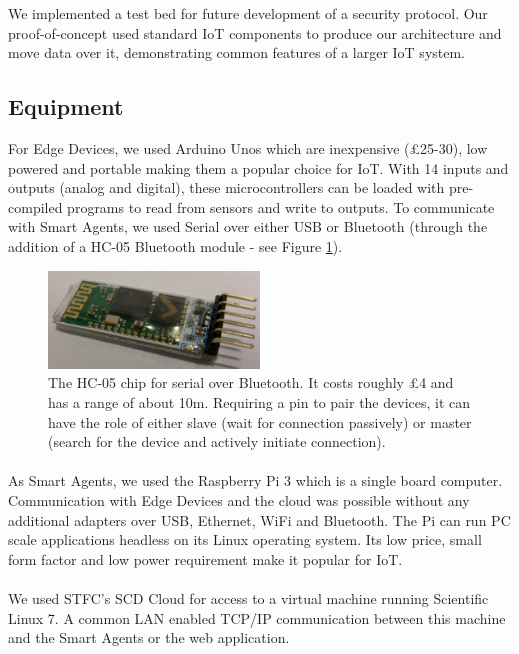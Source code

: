 We implemented a test bed for future development of a security protocol. Our proof-of-concept used standard IoT components to produce our architecture and move data over it, demonstrating common features of a larger IoT system.

\subsection{Equipment}
For Edge Devices, we used Arduino Unos which are inexpensive (£25-30), low powered and portable making them a popular choice for IoT. With 14 inputs and outputs (analog and digital), these microcontrollers can be loaded with pre-compiled programs to read from sensors and write to outputs. To communicate with Smart Agents, we used Serial over either USB or Bluetooth (through the addition of a HC-05 Bluetooth module - see Figure \ref{fig:HC-05}).


\begin{figure}
    \centering
    \includegraphics[width=0.5\textwidth]{HC05.jpg}
    \caption{The HC-05 chip for serial over Bluetooth. It costs roughly £4 and has a range of about 10m. Requiring a pin to pair the devices, it can have the role of either slave (wait for connection passively) or master (search for the device and actively initiate connection).}
    \label{fig:HC-05}
\end{figure}

\paragraph{}
As Smart Agents, we used the Raspberry Pi 3 which is a single board computer. Communication with Edge Devices and the cloud was possible without any additional adapters over USB, Ethernet, WiFi and Bluetooth. The Pi can run PC scale applications headless on its Linux operating system. Its low price, small form factor and low power requirement make it popular for IoT.

\paragraph{}
We used STFC's SCD Cloud for access to a virtual machine running Scientific Linux 7. A common LAN enabled TCP/IP communication between this machine and the Smart Agents or the web application.

